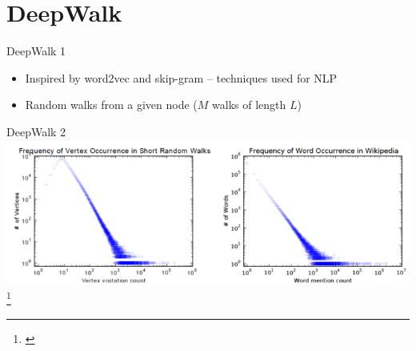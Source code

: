 \documentclass[10pt]{beamer}
\begin{document}
\section{DeepWalk}

\begin{frame}{DeepWalk 1}
	\begin{itemize}
		\item Inspired by word2vec and skip-gram -- techniques used for NLP
		\item Random walks from a given node (\( M \) walks of length \( L \))
	\end{itemize}
\end{frame}

\begin{frame}{DeepWalk 2}
	\centering
	\includegraphics[width=0.8\pagewidth]{images/DeepWalk-word2vec.png}\footnote{\cite{perozzi_deepwalk_2014}}
\end{frame}
\end{document}
